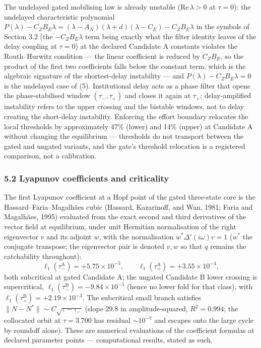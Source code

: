 \documentclass[11pt]{article}
\begin{document}
The undelayed gated mobilising law is already unstable
(\(\mathrm{Re}\,\lambda > 0\) at \(\tau = 0\)): the undelayed
characteristic polynomial
\(P(\lambda) - C_Z B_E\lambda = (\lambda - A_N)(\lambda + d)(\lambda - C_E) - C_Z B_E\lambda\)
in the symbols of Section 3.2 (the \(-C_Z B_E\lambda\) term being
exactly what the filter identity leaves of the delay coupling at
\(\tau = 0\)) at the declared Candidate A constants violates the
Routh--Hurwitz condition --- the linear coefficient is reduced by
\(C_Z B_E\), so the product of the first two coefficients falls below
the constant term, which is the algebraic signature of the
shortest-delay instability --- and \(P(\lambda) - C_Z B_E\lambda = 0\)
is the undelayed case of (5). Institutional delay acts as a phase filter
that opens the phase-stabilised window \((\tau_-, \tau_+)\) and closes
it again at \(\tau_+\); delay-amplified instability refers to the upper
crossing and the bistable windows, not to delay creating the short-delay
instability. Enforcing the effort boundary relocates the local
thresholds by approximately 47\% (lower) and 14\% (upper) at Candidate A
without changing the equilibrium --- thresholds do not transport between
the gated and ungated variants, and the gate's threshold relocation is a
registered comparison, not a calibration.

\subsubsection{5.2 Lyapunov coefficients and
criticality}\label{lyapunov-coefficients-and-criticality}

The first Lyapunov coefficient at a Hopf point of the gated three-state
core is the Hassard--Faria--Magalh\~aes cubic (Hassard, Kazarinoff, and
Wan, 1981; Faria and Magalh\~aes, 1995) evaluated from the exact second
and third derivatives of the vector field at equilibrium, under unit
Hermitian normalisation of the right eigenvector \(v\) and its adjoint
\(w\), with the normalisation \(w^*\Delta'(i\omega)v = 1\) (\(w^*\) the
conjugate transpose; the eigenvector pair is denoted \(v, w\) so that
\(q\) remains the catchability throughout):
\[\ell_1(\tau_-^{\mathrm{A}}) = +5.75\times10^{-5}, \qquad \ell_1(\tau_+^{\mathrm{A}}) = +3.55\times10^{-4},\]
both subcritical at gated Candidate A; the ungated Candidate B lower
crossing is supercritical,
\(\ell_1(\tau_-^{\mathrm{B}}) = -9.84\times10^{-5}\) (hence no lower
fold for that class), with
\(\ell_1(\tau_+^{\mathrm{B}}) = +2.19\times10^{-3}\). The subcritical
small branch satisfies \(\|N - N^*\| \sim C\sqrt{\tau - \tau_-}\) (slope
29.8 in amplitude-squared, \(R^2 = 0.994\); the collocated orbit at
\(\tau = 3.700\) has residual \(\sim10^{-7}\) and escapes onto the large
cycle by roundoff alone). These are numerical evaluations of the
coefficient formulas at declared parameter points --- computational
results, stated as such.
\end{document}
